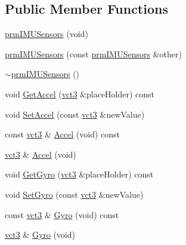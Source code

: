 \subsection*{Public Member Functions}
\begin{DoxyCompactItemize}
\item 
\hyperlink{classprm_i_m_u_sensors_a42773d9ce672b929dd6585d3fb3b76d0}{prm\+I\+M\+U\+Sensors} (void)
\item 
\hyperlink{classprm_i_m_u_sensors_a91b0cd6d0132b7a4e15060f84b9b9456}{prm\+I\+M\+U\+Sensors} (const \hyperlink{classprm_i_m_u_sensors}{prm\+I\+M\+U\+Sensors} \&other)
\item 
\hyperlink{classprm_i_m_u_sensors_aabeab69e38da2d8b0cffa5b488e9c3da}{$\sim$prm\+I\+M\+U\+Sensors} ()
\item 
void \hyperlink{classprm_i_m_u_sensors_a8290b19cc879f50e2d13e59024435106}{Get\+Accel} (\hyperlink{vct_fixed_size_vector_types_8h_a3af82acdbf4eeb73c551909240b106ea}{vct3} \&place\+Holder) const 
\item 
void \hyperlink{classprm_i_m_u_sensors_a102844d8719c94179a4bf2f84490d8d6}{Set\+Accel} (const \hyperlink{vct_fixed_size_vector_types_8h_a3af82acdbf4eeb73c551909240b106ea}{vct3} \&new\+Value)
\item 
const \hyperlink{vct_fixed_size_vector_types_8h_a3af82acdbf4eeb73c551909240b106ea}{vct3} \& \hyperlink{classprm_i_m_u_sensors_aaff439a1c2f515cb42ceba11655717d8}{Accel} (void) const 
\item 
\hyperlink{vct_fixed_size_vector_types_8h_a3af82acdbf4eeb73c551909240b106ea}{vct3} \& \hyperlink{classprm_i_m_u_sensors_a47b60889a72a7fc576ac7fb81ae11ea1}{Accel} (void)
\item 
void \hyperlink{classprm_i_m_u_sensors_a10b05337289a4ff701184ab6f75850e5}{Get\+Gyro} (\hyperlink{vct_fixed_size_vector_types_8h_a3af82acdbf4eeb73c551909240b106ea}{vct3} \&place\+Holder) const 
\item 
void \hyperlink{classprm_i_m_u_sensors_af5a9c1f1d6e62e805a725fe32edfe812}{Set\+Gyro} (const \hyperlink{vct_fixed_size_vector_types_8h_a3af82acdbf4eeb73c551909240b106ea}{vct3} \&new\+Value)
\item 
const \hyperlink{vct_fixed_size_vector_types_8h_a3af82acdbf4eeb73c551909240b106ea}{vct3} \& \hyperlink{classprm_i_m_u_sensors_aa255efe7ef9ca9f4bb1e3705c1a7cef5}{Gyro} (void) const 
\item 
\hyperlink{vct_fixed_size_vector_types_8h_a3af82acdbf4eeb73c551909240b106ea}{vct3} \& \hyperlink{classprm_i_m_u_sensors_a543d37d0a82928686b920825dac7c8df}{Gyro} (void)

\end{DoxyCompactItemize}
